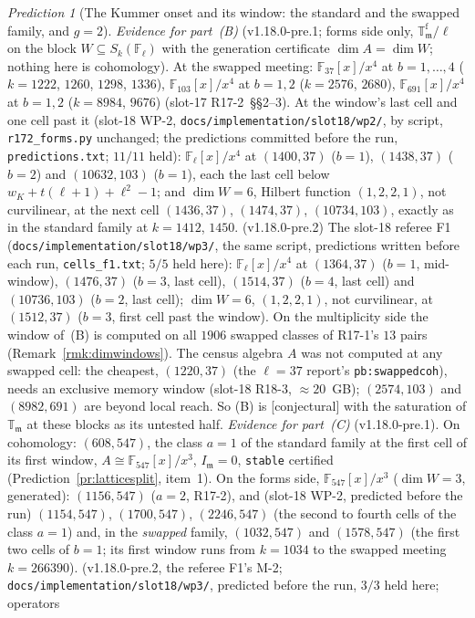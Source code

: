 \documentclass[11pt]{article}
\theoremstyle{remark}
\newtheorem{prediction}[theorem]{Prediction}
\newcommand{\F}{\mathbb{F}}
\newcommand{\Fl}{\F_\ell}
\newcommand{\T}{\mathbb{T}}
\newcommand{\m}{\mathfrak{m}}
\newcommand{\CONJ}{\textsf{[conjectural]}}
\begin{document}
\begin{prediction}[The Kummer onset and its window: the standard and the swapped family, and $g=2$]
\emph{Evidence for part~(B)} (v1.18.0-pre.1; forms side only, $\T^{\mathrm f}_\m/\ell$ on the block $W\subseteq S_k(\Fl)$ with the generation certificate
$\dim A=\dim W$; nothing here is cohomology). At the swapped meeting: $\F_{37}[x]/x^4$ at $b=1,\dots,4$ ($k=1222$, $1260$, $1298$, $1336$), $\F_{103}[x]/x^4$ at
$b=1,2$ ($k=2576$, $2680$), $\F_{691}[x]/x^4$ at $b=1,2$ ($k=8984$, $9676$) (slot-17 R17-2~\S\S2--3). At the window's last cell and one cell past it
(slot-18 WP-2, \texttt{docs/implementation/slot18/wp2/}, by script, \texttt{r172\_forms.py} unchanged; the predictions committed before the run, \texttt{predictions.txt};
$11/11$ held): $\Fl[x]/x^4$ at $(1400,37)$ ($b=1$), $(1438,37)$ ($b=2$) and $(10632,103)$ ($b=1$), each the last cell below
$w_K+t(\ell+1)+\ell^{2}-1$; and $\dim W=6$, Hilbert function $(1,2,2,1)$, not curvilinear, at the next cell $(1436,37)$, $(1474,37)$, $(10734,103)$, exactly as
in the standard family at $k=1412$, $1450$. (v1.18.0-pre.2) The slot-18 referee F1 (\texttt{docs/implementation/slot18/wp3/}, the same script, predictions
written before each run, \texttt{cells\_f1.txt}; $5/5$ held here): $\Fl[x]/x^4$ at $(1364,37)$ ($b=1$, mid-window), $(1476,37)$ ($b=3$, last cell),
$(1514,37)$ ($b=4$, last cell) and $(10736,103)$ ($b=2$, last cell); $\dim W=6$, $(1,2,2,1)$, not curvilinear, at $(1512,37)$ ($b=3$, first cell past the window).
On the multiplicity side the window of~(B) is computed on all $1906$ swapped classes of R17-1's $13$ pairs
(Remark~\ref{rmk:dimwindows}). The census algebra $A$ was not computed at any swapped cell: the cheapest, $(1220,37)$ (the $\ell=37$ report's \texttt{pb:swappedcoh}), needs an
exclusive memory window (slot-18 R18-3, $\approx20$~GB); $(2574,103)$ and $(8982,691)$ are beyond local reach. So (B) is \CONJ{} with the saturation of
$\T_\m$ at these blocks as its untested half.
\emph{Evidence for part~(C)} (v1.18.0-pre.1). On cohomology: $(608,547)$, the class $a=1$ of the standard family at the first cell of its first window,
$A\cong\F_{547}[x]/x^3$, $I_\m=0$, \texttt{stable} certified (Prediction~\ref{pr:latticesplit}, item~1). On the forms side, $\F_{547}[x]/x^3$ ($\dim W=3$,
generated): $(1156,547)$ ($a=2$, R17-2), and (slot-18 WP-2, predicted before the run) $(1154,547)$, $(1700,547)$, $(2246,547)$ (the second to fourth cells of the
class $a=1$) and, in the \emph{swapped} family, $(1032,547)$ and $(1578,547)$ (the first two cells of $b=1$; its first window runs from $k=1034$ to the swapped
meeting $k=266390$). (v1.18.0-pre.2, the referee F1's M-2; \texttt{docs/implementation/slot18/wp3/}, predicted before the run, $3/3$ held here; operators

\end{prediction}
\end{document}
